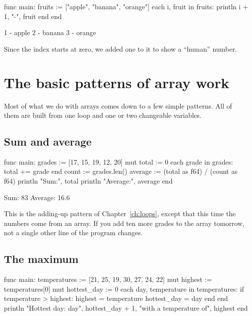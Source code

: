 \begin{salamcode}
func main:
    fruits := ["apple", "banana", "orange"]
    each i, fruit in fruits:
        println i + 1, "-", fruit
    end
end
\end{salamcode}

\begin{salamout}
1 - apple
2 - banana
3 - orange
\end{salamout}

Since the index starts at zero, we added one to it to show a ``human''
number.

\section{The basic patterns of array work}

Most of what we do with arrays comes down to a few simple patterns. All of
them are built from one  loop and one or two changeable
variables.

\subsection{Sum and average}

\begin{salamcode}
func main:
    grades := [17, 15, 19, 12, 20]
    mut total := 0
    each grade in grades:
        total += grade
    end
    count := grades.len()
    average := (total as f64) / (count as f64)
    println "Sum:", total
    println "Average:", average
end
\end{salamcode}

\begin{salamout}
Sum: 83
Average: 16.6
\end{salamout}

This is the adding-up pattern of Chapter~\ref{ch:loops}, except that this
time the numbers come from an array. If you add ten more grades to the array
tomorrow, not a single other line of the program changes.

\subsection{The maximum}

\begin{salamcode}
func main:
    temperatures := [21, 25, 19, 30, 27, 24, 22]
    mut highest := temperatures[0]
    mut hottest_day := 0
    each day, temperature in temperatures:
        if temperature > highest:
            highest = temperature
            hottest_day = day
        end
    end
    println "Hottest day: day", hottest_day + 1, "with a temperature of", highest
end
\end{salamcode}

